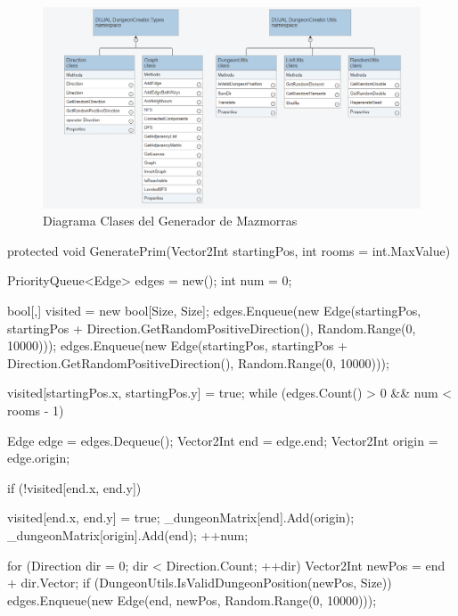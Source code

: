 \begin{figure}[H]
  \centering
    \includegraphics[width=450px,clip=true]{Dungeon_Generator_Utils.png}
  \caption{Diagrama Clases del Generador de Mazmorras}
  \label{fig:dungen2}
\end{figure}

\begin{mypython}[caption={Algoritmo de Generación de Mazmorras utilizando Prim.},label={alg:dungenprim}]
    protected void GeneratePrim(Vector2Int startingPos, int rooms = int.MaxValue)
    {
        PriorityQueue<Edge> edges = new();
        int num = 0;

        bool[,] visited = new bool[Size, Size];
        edges.Enqueue(new Edge(startingPos, startingPos + Direction.GetRandomPositiveDirection(), Random.Range(0, 10000)));
        edges.Enqueue(new Edge(startingPos, startingPos + Direction.GetRandomPositiveDirection(), Random.Range(0, 10000)));

        visited[startingPos.x, startingPos.y] = true;
        while (edges.Count() > 0 && num < rooms - 1)
        {

            Edge edge = edges.Dequeue();
            Vector2Int end = edge.end;
            Vector2Int origin = edge.origin;

            if (!visited[end.x, end.y])
            {
                visited[end.x, end.y] = true;
                _dungeonMatrix[end].Add(origin);
                _dungeonMatrix[origin].Add(end);
                ++num;

                for (Direction dir = 0; dir < Direction.Count; ++dir)
                {
                    Vector2Int newPos = end + dir.Vector;
                    if (DungeonUtils.IsValidDungeonPosition(newPos, Size))
                    {
                        edges.Enqueue(new Edge(end, newPos, Random.Range(0, 10000)));
                    }
                }
            }
        }
    }
\end{mypython}

